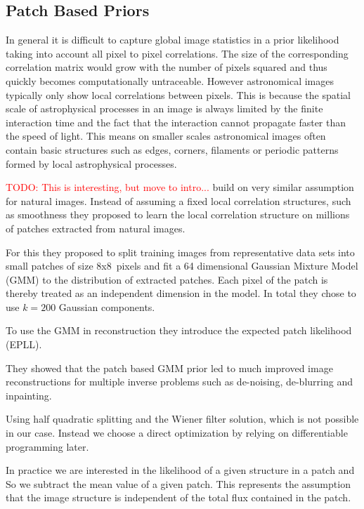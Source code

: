 \documentclass[twocolumn]{aastex631}
\newcommand{\todo}[1]{\textcolor{red}{TODO: #1}\PackageWarning{TODO:}{#1!}}
\begin{document}
    \subsection{Patch Based Priors}
    In general it is difficult to capture global image statistics in a prior likelihood
    taking into account all pixel to pixel correlations. The size of the corresponding
    correlation matrix would grow with the number of pixels squared and thus quickly
    becomes computationally untraceable. However astronomical images typically only
    show local correlations between pixels. This is because the spatial
    scale of astrophysical processes in an image is always limited by the finite
    interaction time and the fact that the interaction cannot propagate
    faster than the speed of light. This means on smaller scales astronomical
    images often contain basic structures such as edges, corners, filaments or
    periodic patterns formed by local astrophysical processes.

    \todo{This is interesting, but move to intro...}
    \cite{Zoran2011} build on very similar assumption for natural images.
    Instead of assuming a fixed local correlation structures, such as smoothness
    they proposed to learn the local correlation structure on millions of patches
    extracted from natural images. 
    
    For this they proposed to split training images from representative
    data sets into small patches of size 8x8~pixels and fit a 64 dimensional
    Gaussian Mixture Model (GMM) to the distribution of extracted patches. Each pixel of the patch 
    is thereby treated as an independent dimension in the model. In total
    they chose to use $k=200$ Gaussian components.
    
    To use the GMM in reconstruction they introduce the expected patch likelihood (EPLL). 
    
    They showed that the patch based GMM prior led to much improved image reconstructions for multiple inverse problems such as de-noising, de-blurring and inpainting.

    Using half quadratic splitting and the Wiener filter solution, which is not possible
    in our case. Instead we choose a direct optimization by relying on differentiable
    programming later. 
    
    In practice we are interested in the likelihood of a given structure in a patch and
    So we subtract the mean value of a given patch. This represents the assumption that
    the image structure is independent of the total flux contained in the patch.
    
\end{document}
